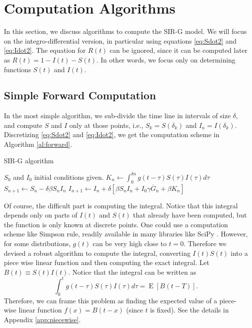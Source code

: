 \documentclass[USenglish,10pt]{article}
\newcommand{\Gb}{\overline{G}\xspace}
\DeclareMathOperator{\Exp}{E}       %
\newcommand{\E}[1]{\Exp\left[{#1}\right]}       %
\begin{document}
\section{Computation Algorithms}\label{sc:algorithm}

In this section, we discuss algorithms to compute the SIR-G model. We will focus on the integro-differential version, in particular using equations \eqref{eq:Sdot2} and \eqref{eq:Idot2}. The equation for $R(t)$ can be ignored, since it can be computed later as $R(t)=1-I(t)-S(t)$. In other words, we focus only on determining functions $S(t)$ and $I(t)$.

\subsection{Simple Forward Computation}

In the most simple algorithm, we sub-divide the time line in intervals of size $\delta$, and compute $S$ and $I$ only at those points, i.e., $S_k=S(\delta_k)$ and $I_n=I(\delta_k)$. Discretizing \eqref{eq:Sdot2} and \eqref{eq:Idot2}, we get the computation scheme in Algorithm \ref{al:forward}.

\begin{algorithm}[ht]
    \caption{SIR-G algorithm}
    \label{al:simple}
    \begin{algorithmic}[1] %
		\State	$S_0$ and $I_0$  initial conditions given.
			\State $K_n \gets \int_0^{\delta n} g(t-\tau) S(\tau)I(\tau)d\tau$
			\State $S_{n+1} \gets  S_n - \delta\beta S_n I_n$
			\State $I_{n+1} \gets  I_n + \delta\left[\beta S_n I_n + I_0\gamma\Gb_n + \beta K_n\right]$
		\EndFor
    \end{algorithmic}
    \label{al:forward}
\end{algorithm}


Of course, the difficult part is computing the integral. Notice that this integral depends only on parts of $I(t)$ and $S(t)$ that already have been computed, but the function is only known at discrete points.
One could use a computation scheme like Simpson rule, readily available in many libraries like SciPy \cite{jon.ea.01}. However, for some distributions, $g(t)$ can be very high close to $t=0$. Therefore we devised a robust algorithm to compute the integral, converting $I(t)S(t)$ into a piece wise linear function and then computing the exact integral. Let $B(t)\equiv S(t)I(t)$. Notice that the integral can be written as
\[ \int_0^{t} g(t-\tau) S(\tau)I(\tau)d\tau = \E{B(t-T)}.  \]
Therefore, we can frame this problem as finding the expected value of a piece-wise linear function $f(x)=B(t-x)$ (since $t$ is fixed). See the details in Appendix \ref{app:piecewise}.
\end{document}
